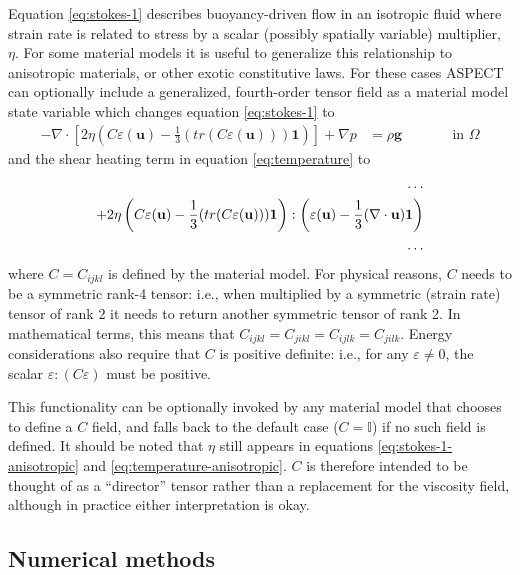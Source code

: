 \documentclass{article}
\newcommand{\aspect}{\textsc{ASPECT}}
\begin{document}
Equation \eqref{eq:stokes-1} describes buoyancy-driven flow in an isotropic
fluid where strain rate is related to stress by a scalar (possibly spatially variable)
multiplier, $\eta$. For some material models it is useful to generalize this
relationship to anisotropic materials, or other exotic constitutive laws.
For these cases \aspect{} can optionally include a generalized, fourth-order
tensor field as a material model state variable which changes equation
\eqref{eq:stokes-1} to
\begin{align}
  \label{eq:stokes-1-anisotropic}
  -\nabla \cdot \left[2\eta \left(C \varepsilon(\mathbf u)
                                  - \frac{1}{3}(tr(C \varepsilon(\mathbf u)))\mathbf 1\right)
                \right] + \nabla p &=
  \rho \mathbf g
  & \qquad
  & \textrm{in $\Omega$}
\end{align}
and the shear heating term in equation \eqref{eq:temperature} to
\begin{align}
  \label {eq:temperature-anisotropic}
  \dots
  \notag
  \\
  + 2 \eta
  \left(C \varepsilon(\mathbf u) - \frac{1}{3}(tr(C \varepsilon(\mathbf u)))\mathbf 1\right)
  :
  \left(\varepsilon(\mathbf u) - \frac{1}{3}(\nabla \cdot \mathbf u)\mathbf 1\right)
  \\
  \dots
  \notag
\end{align}
where $C = C_{ijkl}$ is defined by the material model. For physical reasons, $C$ needs
to be a symmetric rank-4 tensor: i.e., when multiplied by a symmetric (strain rate)
tensor of rank 2 it needs to return another symmetric tensor of rank 2. In mathematical
terms, this means that $C_{ijkl}=C_{jikl}=C_{ijlk}=C_{jilk}$. Energy considerations
also require that $C$ is positive definite: i.e., for any $\varepsilon \neq 0$, the
scalar $\varepsilon : (C \varepsilon)$ must be positive.

This functionality can be optionally invoked by any material model that chooses to
define a $C$ field, and falls back to the default case ($C=\mathbb I$) if no such
field is defined. It should be noted that $\eta$ still appears in equations
\eqref{eq:stokes-1-anisotropic} and \eqref{eq:temperature-anisotropic}. $C$ is
therefore intended to be thought of as a ``director'' tensor rather than a
replacement for the viscosity field, although in practice either interpretation
is okay.


\subsection{Numerical methods}
\end{document}
